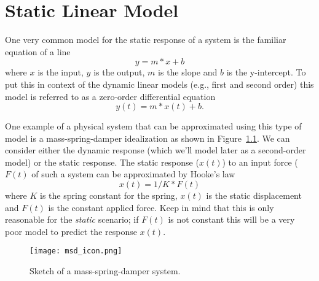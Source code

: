 \chapter{Static Linear Model}\label{c:linear}

One very common model for the static response of a system is the familiar equation of a line
\begin{equation}\label{e:line}
y = m*x+b
\end{equation}
where $x$ is the input, $y$ is the output, $m$ is the slope and $b$ is the y-intercept.  To put this in context of the dynamic linear models (e.g., first and second order) this model is referred to as a zero-order differential equation
\begin{equation}\label{e:zero}
y(t) = m*x(t)+b.
\end{equation}

One example of a physical system that can be approximated using this type of model is a mass-spring-damper idealization as shown in Figure~\ref{f:msd}.  We can consider either the dynamic response (which we'll model later as a second-order model) or the static response.  The static response ($x(t)$) to an input force ($F(t)$ of such a system can be approximated by Hooke's law
\begin{equation}\label{e:hooke}
x(t) = 1/K*F(t)
\end{equation}
where $K$ is the spring constant for the spring, $x(t)$ is the static displacement and $F(t)$ is the constant applied force.  Keep in mind that this is only reasonable for the \emph{static} scenario; if $F(t)$ is not constant this will be a very poor model to predict the response $x(t)$.

\begin{figure}[htb!]
\centerline{
{\texttt{[image: msd\_icon.png]}}}
\caption{Sketch of a mass-spring-damper system.}
\label{f:msd}
\end{figure}


